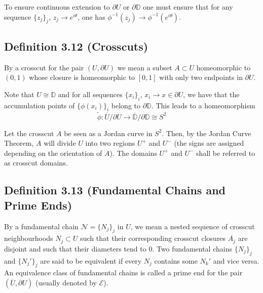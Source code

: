 \documentclass[11pt,a4paper]{article}
\begin{document}


      To ensure continuous extension to $\partial U$ or $\partial \mathbb{D}$ one must ensure that for any sequence $\{z_j\}_j$, $z_j \rightarrow e^{i\theta}$, one has $\phi^{-1}(z_j) \rightarrow \phi^{-1}(e^{i\theta})$.

      \subsection*{Definition 3.12 (Crosscuts)} By a crosscut for the pair $(U, \partial U)$ we mean a subset $A \subset U$ homeomorphic to $(0, 1)$ whose closure is homeomorphic to $[0,1]$ with only two endpoints in $\partial U$.



      Note that $U \cong \mathbb{D}$ and for all sequences $\{x_i\}_i$, $x_i \rightarrow x \in \partial U$, we have that the accumulation points of $\{\phi(x_i)\}_i$ belong to $\partial \mathbb{D}$. This leads to a homeomorphism
      $$\tilde{\phi}: \overline{U}/\partial U \rightarrow \overline{\mathbb{D}}/\partial \mathbb{D} \cong S^2$$


      Let the crosscut $A$ be seen as a Jordan curve in $S^2$. Then, by the Jordan Curve Theorem, $A$ will divide $U$ into two regions $U^+$ and $U^-$ (the signs are assigned depending on the orientation of $A$). The domains $U^+$ and $U^-$ shall be referred to as crosscut domains.

      \subsection*{Definition 3.13 (Fundamental Chains and Prime Ends)} By a fundamental chain $\mathcal{N} = \{N_j\}_j$ in $U$, we mean a nested sequence of crosscut neighbourhoods $N_j \subset U$ such that their corresponding crosscut closures $\overline{A_j}$ are disjoint and such that their diameters tend to $0$. Two fundamental chains $\{N_j\}_j$ and $\{N_j'\}_j$ are said to be equivalent if every $N_j$ contains some $N_k'$ and vice versa. An equivalence class of fundamental chains is called a prime end for the pair $(\overline{U}, \partial U)$ (usually denoted by $\mathcal{E}$).

\end{document}
